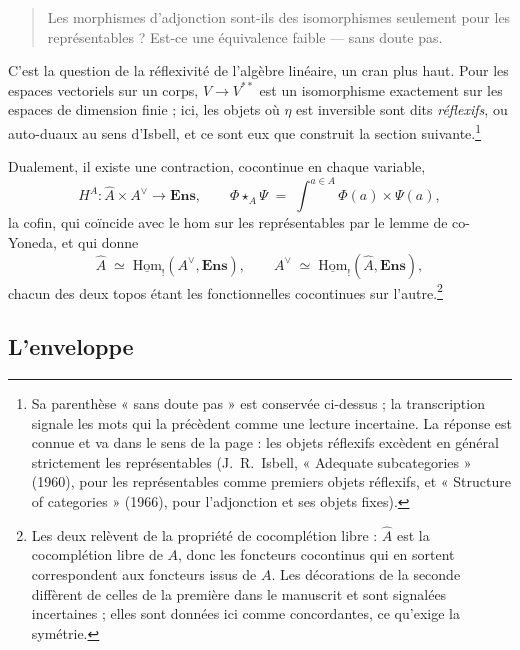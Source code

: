 \documentclass[11pt,a4paper]{article}
\begin{document}
\begin{quote}
Les morphismes d'adjonction sont-ils des isomorphismes seulement pour les
représentables ? Est-ce une équivalence faible — sans doute pas.
\end{quote}

C'est la question de la réflexivité de l'algèbre linéaire, un cran plus haut.
Pour les espaces vectoriels sur un corps, $V \to V^{**}$ est un isomorphisme
exactement sur les espaces de dimension finie ; ici, les objets où $\eta$ est
inversible sont dits \emph{réflexifs}, ou auto-duaux au sens d'Isbell, et ce
sont eux que construit la section suivante.\footnote{Sa parenthèse « sans
doute pas » est conservée ci-dessus ; la transcription signale les mots qui la
précèdent comme une lecture incertaine. La réponse est connue et va dans le
sens de la page : les objets réflexifs excèdent en général strictement les
représentables (J.~R.~Isbell, « Adequate subcategories » (1960), pour les
représentables comme premiers objets réflexifs, et « Structure of
categories » (1966), pour l'adjonction et ses objets fixes).}

Dualement, il existe une contraction, cocontinue en chaque variable,
\[
H^{A} : \widehat{A} \times A^{\vee} \longrightarrow \mathbf{Ens},
\qquad
\Phi \star_{A} \Psi \;=\; \int^{a \in A} \Phi(a) \times \Psi(a),
\]
la cofin, qui coïncide avec le hom sur les représentables par le lemme de
co-Yoneda, et qui donne
\[
\widehat{A} \;\simeq\; \underline{\mathrm{Hom}}_{!}(A^{\vee}, \mathbf{Ens}),
\qquad
A^{\vee} \;\simeq\; \underline{\mathrm{Hom}}_{!}(\widehat{A}, \mathbf{Ens}),
\]
chacun des deux topos étant les fonctionnelles cocontinues sur
l'autre.\footnote{Les deux relèvent de la propriété de cocomplétion libre :
$\widehat{A}$ est la cocomplétion libre de $A$, donc les foncteurs cocontinus
qui en sortent correspondent aux foncteurs issus de $A$. Les décorations de la
seconde diffèrent de celles de la première dans le manuscrit et sont signalées
incertaines ; elles sont données ici comme concordantes, ce qu'exige la
symétrie.}

\subsection*{L'enveloppe}
\end{document}
